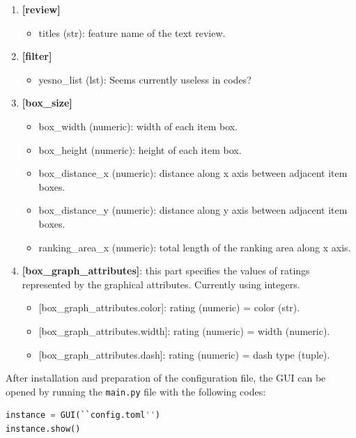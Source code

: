 \documentclass[a4paper,11pt]{memoir}
\begin{document}
\begin{enumerate}
  \item \textbf{[review]}
   \begin{itemize}
    \item titles (str): {feature name of the text review.}
      \end{itemize}

  \item \textbf{[filter]}
   \begin{itemize}
    \item yesno\_list (lst): {\color{red} Seems currently useless in codes?}
      \end{itemize}

  \item \textbf{[box\_size]}
     \begin{itemize}
    \item box\_width (numeric): width of each item box.
    \item box\_height (numeric): height of each item box.
    \item box\_distance\_x  (numeric): distance along x axis between adjacent item boxes.
    \item box\_distance\_y  (numeric): distance along y axis between adjacent item boxes.
    \item ranking\_area\_x  (numeric): total length of the ranking area along x axis.
      \end{itemize}

  \item \textbf{[box\_graph\_attributes]}: 
  this part specifies the values of ratings represented by the graphical attributes.
  {\color{red} Currently using integers.}
  \begin{itemize}
    \item{} [box\_graph\_attributes.color]: rating (numeric) = color (str).
    \item{} [box\_graph\_attributes.width]: rating (numeric) = width (numeric).
    \item{} [box\_graph\_attributes.dash]: rating (numeric) = dash type (tuple).
  \end{itemize}

\end{enumerate}

After installation and preparation of the configuration file, the GUI can be opened by running the \texttt{main.py} file with the following codes:

\begin{lstlisting}[language=Python]
instance = GUI(``config.toml'')
instance.show()
\end{lstlisting}
\end{document}
